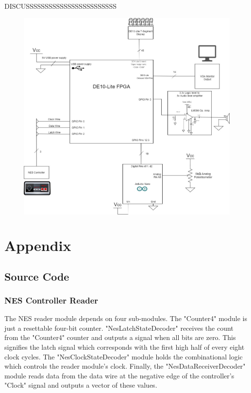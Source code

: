 \documentclass[a4paper]{article}
\begin{document}
DISCUSSSSSSSSSSSSSSSSSSSSSSSS
\begin{figure}[H]
    \includegraphics[width=0.8 \linewidth]{images/hardwareDiagram.jpg}
    \caption{ }
    \label{hardware}
\end{figure}

\section{Appendix}

\subsection{Source Code}%

\subsubsection{NES Controller Reader}
The NES reader module depends on four sub-modules. 
The "Counter4" module is just a resettable four-bit counter.
"NesLatchStateDecoder" receives the count from the "Counter4" counter and outputs a signal when all bits are zero. This signifies the latch signal which corresponds with the first high half of every eight clock cycles.
The "NesClockStateDecoder" module holds the combinational logic which controls the reader module's clock. 
Finally, the "NesDataReceiverDecoder" module reads data from the data wire at the negative edge of the controller's "Clock" signal and outputs a vector of these values. 
\end{document}
